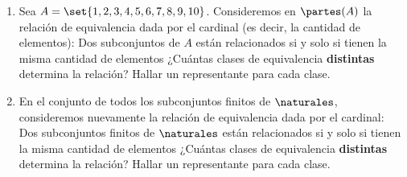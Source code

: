 \begin{enunciado}{\ejercicio}

  \begin{enumerate}[label=\roman*)]
    \item
          Sea $A = \set{1, 2, 3, 4, 5, 6, 7, 8, 9, 10}$. Consideremos en $\partes(A)$ la relación de equivalencia dada
          por el cardinal (es decir, la cantidad de elementos): Dos subconjuntos de $A$ están relacionados si y solo si
          tienen la misma cantidad de elementos ¿Cuántas clases de equivalencia \textbf{distintas}
          determina la relación? Hallar un representante para cada clase.

    \item
          En el conjunto de todos los subconjuntos finitos de $\naturales$, consideremos nuevamente la relación
          de equivalencia dada por el cardinal: Dos subconjuntos finitos de $\naturales$ están relacionados
          si y solo si tienen la misma cantidad de elementos ¿Cuántas clases de equivalencia
          \textbf{distintas} determina la relación?
          Hallar un representante para cada clase.
  \end{enumerate}
\end{enunciado}

